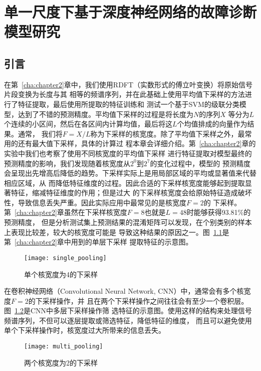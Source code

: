 \chapter{单一尺度下基于深度神经网络的故障诊断模型研究}
\label{cha:chapter3}

\section{引言}

在第~\ref{cha:chapter2}章中，我们使用RDFT（实数形式的傅立叶变换）将原始信号片段变换为长度与其
相等的频谱序列，并在此基础上使用平均值下采样的方法进行了特征提取，最后使用所提取的特征训练和
测试一个基于SVM的级联分类模型，达到了不错的预测精度。平均值下采样的过程是将长度为$N$的序列$X$
等分为$L$个连续的小区间，然后在各区间内计算均值，最后将这$L$个均值排成的向量作为结果。通常，
我们将$F=X/L$称为下采样的核宽度。除了平均值下采样之外，最常用的还有最大值下采样，具体的计算过
程本章会详细介绍。第~\ref{cha:chapter2}章的实验中我们也考察了使用不同核宽度的平均值下采样
进行特征提取对模型最终的预测精度的影响，我们发现随着核宽度从$2^0$到$2^7$的变化过程中，模型的
预测精度会呈现出先增高后降低的趋势。下采样实际上是用局部区域的平均或显著值来代替相应区域，从
而降低特征维度的过程。因此合适的下采样核宽度能够起到提取显著特征，缩减特征维度的作用；但是过大
的下采样核宽度会给原始特征造成破坏性，导致信息丢失严重。因此实际应用中最常见的是核宽度$F=2$的
下采样。第~\ref{cha:chapter2}章虽然在下采样核宽度$F=8$也就是$L=48$时能够获得93.81\%的预测精度，
但是分析测试集上预测结果的混淆矩阵可以发现，在个别类别的样本上表现比较差，较大的核宽度可能是
导致这种结果的原因之一。图~\ref{fig:single_pooling}是第~\ref{cha:chapter2}章中用到的单层下采样
提取特征的示意图。
\begin{figure}[ht]
  \centering%
  \texttt{[image: single\_pooling]}
  \caption{单个核宽度为4的下采样}
  \label{fig:single_pooling}
\end{figure}

在卷积神经网络（Convolutional Neural Network, CNN）中，通常会有多个核宽度$F=2$的下采样操作，并
且在两个下采样操作之间往往会有至少一个卷积层。图~\ref{fig:multi_pooling}是CNN中多层下采样操作筛
选特征的示意图。使用这样的结构来处理信号频谱序列，不但可以逐层提取或筛选特征，降低特征的维度，
而且可以避免使用单个下采样操作时，核宽度过大所带来的信息丢失。
\begin{figure}[ht]
  \centering%
  \texttt{[image: multi\_pooling]}
  \caption{两个核宽度为2的下采样}
  \label{fig:multi_pooling}
\end{figure}


